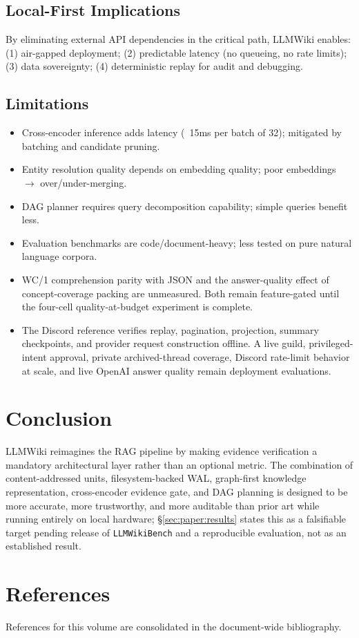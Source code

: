 \subsection{Local-First Implications}
By eliminating external API dependencies in the critical path, LLMWiki enables: (1) air-gapped deployment; (2) predictable latency (no queueing, no rate limits); (3) data sovereignty; (4) deterministic replay for audit and debugging.

\subsection{Limitations}
\begin{itemize}
  \item Cross-encoder inference adds latency (~15ms per batch of 32); mitigated by batching and candidate pruning.
  \item Entity resolution quality depends on embedding quality; poor embeddings $\to$ over/under-merging.
  \item DAG planner requires query decomposition capability; simple queries benefit less.
  \item Evaluation benchmarks are code/document-heavy; less tested on pure natural language corpora.
  \item WC/1 comprehension parity with JSON and the answer-quality effect of concept-coverage packing are unmeasured. Both remain feature-gated until the four-cell quality-at-budget experiment is complete.
  \item The Discord reference verifies replay, pagination, projection, summary checkpoints, and provider request construction offline. A live guild, privileged-intent approval, private archived-thread coverage, Discord rate-limit behavior at scale, and live OpenAI answer quality remain deployment evaluations.
\end{itemize}

\section{Conclusion}
\label{sec:paper:conclusion}

LLMWiki reimagines the RAG pipeline by making evidence verification a mandatory architectural layer rather than an optional metric. The combination of content-addressed units, filesystem-backed WAL, graph-first knowledge representation, cross-encoder evidence gate, and DAG planning is designed to be more accurate, more trustworthy, and more auditable than prior art while running entirely on local hardware; \S\ref{sec:paper:results} states this as a falsifiable target pending release of \texttt{LLMWikiBench} and a reproducible evaluation, not as an established result.

\section*{References}
\label{sec:paper:refs}
References for this volume are consolidated in the document-wide bibliography.

